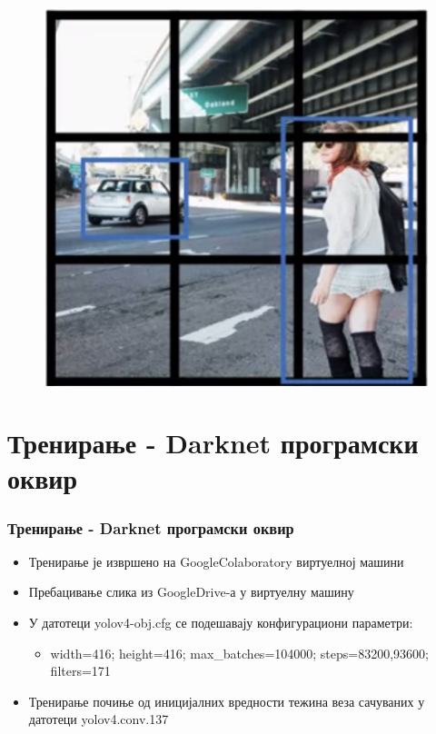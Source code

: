 \begin{frame}
\begin{figure}[H]
      \includegraphics[scale=0.26]{slike/ngYOLO4.png}
\end{figure}
\end{frame}
\section{Тренирање - Darknet програмски оквир}
\begin{frame}
\frametitle{Тренирање - Darknet програмски оквир}
\begin{itemize}
 \item Тренирање је извршено на \alert{GoogleColaboratory} виртуелној машини
 \item Пребацивање слика из GoogleDrive-а у виртуелну машину
 \item У датотеци \alert{yolov4-obj.cfg} се подешавају
 конфигурациони параметри:
 \begin{itemize}
  \item \alert{width}=416; \alert{height}=416; \alert{max\_batches}=104000;
 \alert{steps}=83200,93600; \alert{filters}=171
 \end{itemize}
 \item Тренирање почиње од иницијалних вредности тежина веза
  сачуваних у датотеци \alert{yolov4.conv.137}
\end{itemize}
\end{frame}


